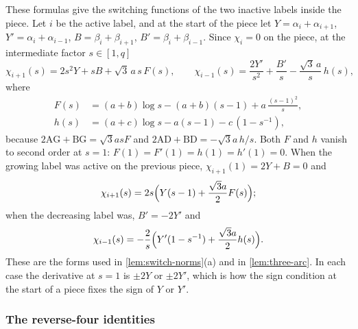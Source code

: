 These formulas give the switching functions of the two inactive labels inside the piece. Let
$i$ be the active label, and at the start of the piece let $Y=\alpha_i+\alpha_{i+1}$,
$Y'=\alpha_i+\alpha_{i-1}$, $B=\beta_i+\beta_{i+1}$, $B'=\beta_i+\beta_{i-1}$. Since $\chi_i=0$ on
the piece, at the intermediate factor $s\in[1,q]$
\[
  \chi_{i+1}(s)=2s^2Y+sB+\sqrt3\,a\,s\,F(s),\qquad
  \chi_{i-1}(s)=\frac{2Y'}{s^2}+\frac{B'}{s}-\frac{\sqrt3\,a}{s}\,h(s),
\]
where
\begin{align*}
  F(s)&=(a+b)\log s-(a+b)(s-1)+a\,\frac{(s-1)^2}{s},\\
  h(s)&=(a+c)\log s-a(s-1)-c\,(1-s^{-1}),
\end{align*}
because $2\mathrm{AG}+\mathrm{BG}=\sqrt3asF$ and $2\mathrm{AD}+\mathrm{BD}=-\sqrt3a\,h/s$. Both $F$ and
$h$ vanish to second order at $s=1$: $F(1)=F'(1)=h(1)=h'(1)=0$. When the growing label was active
on the previous piece, $\chi_{i+1}(1)=2Y+B=0$ and
\[
  \chi_{i+1}(s)=2s\Bigl(Y(s-1)+\frac{\sqrt3a}{2}F(s)\Bigr);
\]
when the decreasing label was, $B'=-2Y'$ and
\[
  \chi_{i-1}(s)=-\frac2s\Bigl(Y'(1-s^{-1})+\frac{\sqrt3a}{2}h(s)\Bigr).
\]
These are the forms used in \cref{lem:switch-norms}(a) and in \cref{lem:three-arc}. In each case the derivative at $s=1$ is $\pm2Y$ or $\pm2Y'$, which is how
the sign condition at the start of a piece fixes the sign of $Y$ or $Y'$.

\subsubsection{The reverse-four identities}\label{app:rev-identities}

